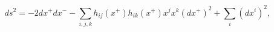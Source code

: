 \begin{equation}
ds^2 = -2 dx^+ dx^- -
 \sum_{i,j,k} h_{ij}(x^+) h_{ik}(x^+) x^j x^k (dx^+)^2 + 
   \sum_i (dx^i)^2 ,
\end{equation}

